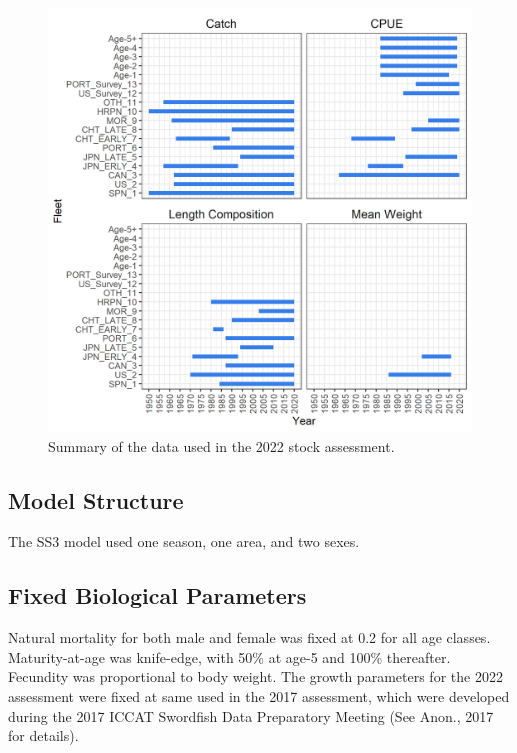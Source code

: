 \documentclass[
]{article}
\begin{document}
\begin{figure}
\centering
\includegraphics{../../img/Data_overview.png}
\caption{\label{fig:data-fig} Summary of the data used in the 2022 stock assessment.}
\end{figure}

\hypertarget{model-structure}{%
\subsection{Model Structure}\label{model-structure}}

The SS3 model used one season, one area, and two sexes.

\hypertarget{fixed-biological-parameters}{%
\subsection{Fixed Biological Parameters}\label{fixed-biological-parameters}}

Natural mortality for both male and female was fixed at 0.2 for all age classes. Maturity-at-age was knife-edge, with 50\% at age-5 and 100\% thereafter. Fecundity was proportional to body weight. The growth parameters for the 2022 assessment were fixed at same used in the 2017 assessment, which were developed during the 2017 ICCAT Swordfish Data Preparatory Meeting (See Anon., 2017 for details).
\end{document}
